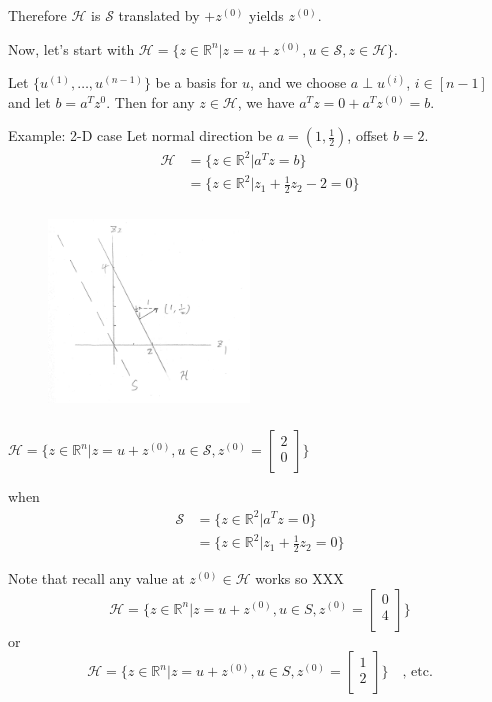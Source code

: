 Therefore $\mathcal{H}$ is $\mathcal{S}$ translated by $+z^{(0)}$ yields $z^{(0)}$. 

Now, let's start with $\mathcal{H} = \{ z \in \mathbb{R}^n | z = u + z^{(0)}, u \in \mathcal{S}, z \in \mathcal{H} \}$. 

Let $\{ u^{(1)}, \dots, u^{(n-1)} \}$ be a basis for $u$, and we choose $a \perp u^{(i)}$, $i \in [n-1]$ and let $b = a^{T} z^{0}$. Then for any $z \in \mathcal{H}$, we have $a^{T} z = 0 + a^{T} z^{(0)} = b$. 


\vspace{0.3cm}
Example: 2-D case
Let normal direction be $a = (1, \frac{1}{2})$, offset $b = 2$.
\begin{align*}
\mathcal{H} &= \{z \in \mathbb{R}^2 | a^{T} z = b \} \\
&= \{z \in \mathbb{R}^2 | z_1 + \frac{1}{2} z_2 - 2 = 0 \}
\end{align*}


\begin{figure}
	\centering
	\includegraphics[width=2.1in,height=2.1in]{figures/ch02/p37.jpg}
\end{figure}


$\mathcal{H} = \{ z \in \mathbb{R}^n | z = u + z^{(0)}, u \in \mathcal{S}, z^{(0)} = \begin{bmatrix} 2\\ 0\\ \end{bmatrix} \}$

when 
\begin{align*}
\mathcal{S} &= \{z \in \mathbb{R}^2 | a^{T} z = 0 \} \\
&= \{z \in \mathbb{R}^2 | z_1 + \frac{1}{2} z_2 = 0 \}
\end{align*}

Note that recall any value at $z^{(0)} \in \mathcal{H}$ works so XXX
$$\mathcal{H} = \{ z \in \mathbb{R}^n | z = u + z^{(0)}, u \in S, z^{(0)} = \begin{bmatrix} 0\\ 4\\ \end{bmatrix} \}$$
or 
$$\mathcal{H} = \{ z \in \mathbb{R}^n | z = u + z^{(0)}, u \in S, z^{(0)} = \begin{bmatrix} 1\\ 2\\ \end{bmatrix} \}\quad \text{, etc.} $$

